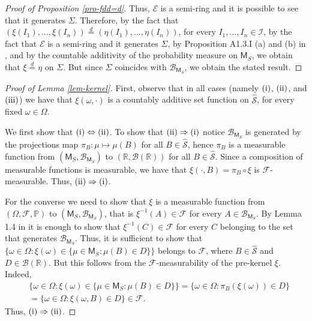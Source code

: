 \documentclass{article}
\theoremstyle{plain}
\theoremstyle{remark}
\begin{document}
\begin{proof}[Proof of Proposition \ref{pro-fdd=d}]
	Thus, $\mathcal{E}$ is a semi-ring and it is possible to see that it generates $\Sigma$. Therefore, by the fact that $(\xi(I_1),...,\xi(I_n))\stackrel{d}{=}(\eta(I_1),...,\eta(I_n))$, for every $I_1,...,I_n\in\mathcal{I}$, by the fact that $\mathcal{E}$ is a semi-ring and it generates $\Sigma$, by Proposition A1.3.I (a) and (b) in \cite{Daley1}, and by the countable additivity of the probability measure on $\mathsf{M}_S$, we obtain that $\xi\stackrel{d}{=}\eta$ on $\Sigma$. But since $\Sigma$ coincides with $\mathcal{B}_{\mathsf{M}_S}$, we obtain the stated result.
\end{proof}



\begin{proof}[Proof of Lemma \ref{lem-kernel}]
	First, observe that in all cases (namely $\textnormal{(i)}$, $\textnormal{(ii)}$, and $\textnormal{(iii)}$) we have that $\xi(\omega,\cdot )$ is a countably additive set function on $\hat{\mathcal{S}}$, for every fixed $\omega\in\Omega$. 
	
	We first show that $\textnormal{(i)}\Leftrightarrow\textnormal{(ii)}$. To show that $\textnormal{(ii)}\Rightarrow\textnormal{(i)}$ notice $\mathcal{B}_{\mathsf{M}_S}$ is generated by the projections map $\pi_{B}:\mu\mapsto\mu(B)$ for all $B\in\hat{\mathcal{S}}$, hence $\pi_B$ is a measurable function from $(\mathsf{M}_S,\mathcal{B}_{\mathsf{M}_S})$ to $(\mathbb{R},\mathcal{B}(\mathbb{R}))$ for all $B\in\hat{\mathcal{S}}$. Since a composition of measurable functions is measurable, we have that $\xi(\cdot,B)=\pi_B\circ\xi$ is $\mathcal{F}$-measurable. Thus, $\textnormal{(ii)}\Rightarrow\textnormal{(i)}$. 
	
	For the converse we need to show that $\xi$ is a measurable function from $(\Omega,\mathcal{F},\mathbb{P})$ to $(\mathsf{M}_S,\mathcal{B}_{\mathsf{M}_S})$, that is $\xi^{-1}(A)\in\mathcal{F}$ for every $A\in \mathcal{B}_{\mathsf{M}_S}$. By Lemma 1.4 in \cite{Kallenberg} it is enough to show that $\xi^{-1}(C)\in\mathcal{F}$ for every $C$ belonging to the set that generates $\mathcal{B}_{\mathsf{M}_S}$. Thus, it is sufficient to show that
	$\{\omega\in\Omega: \xi(\omega)\in\{\mu\in\mathsf{M}_S:\mu(B)\in D\} \}$ belongs to $\mathcal{F}$, where $B\in\hat{\mathcal{S}}$ and $D\in\mathcal{B}(\mathbb{R})$. But this follows from the $\mathcal{F}$-measurability of the pre-kernel $\xi$. Indeed, 
	\begin{align*}
		&\{\omega\in\Omega: \xi(\omega)\in\{\mu\in\mathsf{M}_S:\mu(B)\in D\}\}=	\{\omega\in\Omega: \pi_B(\xi(\omega))\in D\}\\&	=\{\omega\in\Omega: \xi(\omega,B)\in D\}\in\mathcal{F}.
	\end{align*}
	Thus, $\textnormal{(i)}\Rightarrow\textnormal{(ii)}$.
	

\end{proof}
\end{document}
